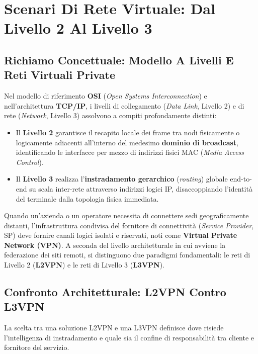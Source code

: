\documentclass[11pt, a4paper]{article}
\begin{document}
\section{Scenari Di Rete Virtuale: Dal Livello 2 Al Livello 3}

\subsection{Richiamo Concettuale: Modello A Livelli E Reti Virtuali Private}
Nel modello di riferimento \textbf{OSI} (\emph{Open Systems Interconnection}) e nell'architettura \textbf{TCP/IP}, i livelli di collegamento (\emph{Data Link}, Livello 2) e di rete (\emph{Network}, Livello 3) assolvono a compiti profondamente distinti:
\begin{itemize}[noitemsep]
    \item Il \textbf{Livello 2} garantisce il recapito locale dei frame tra nodi fisicamente o logicamente adiacenti all'interno del medesimo \textbf{dominio di broadcast}, identificando le interfacce per mezzo di indirizzi fisici MAC (\emph{Media Access Control}).
    \item Il \textbf{Livello 3} realizza l'\textbf{instradamento gerarchico} (\emph{routing}) globale end-to-end su scala inter-rete attraverso indirizzi logici IP, disaccoppiando l'identità del terminale dalla topologia fisica immediata.
\end{itemize}

Quando un'azienda o un operatore necessita di connettere sedi geograficamente distanti, l'infrastruttura condivisa del fornitore di connettività (\emph{Service Provider}, SP) deve fornire canali logici isolati e riservati, noti come \textbf{Virtual Private Network (VPN)}. A seconda del livello architetturale in cui avviene la federazione dei siti remoti, si distinguono due paradigmi fondamentali: le reti di Livello 2 (\textbf{L2VPN}) e le reti di Livello 3 (\textbf{L3VPN}).


\subsection{Confronto Architetturale: L2VPN Contro L3VPN}
La scelta tra una soluzione L2VPN e una L3VPN definisce dove risiede l'intelligenza di instradamento e quale sia il confine di responsabilità tra cliente e fornitore del servizio.
\end{document}
